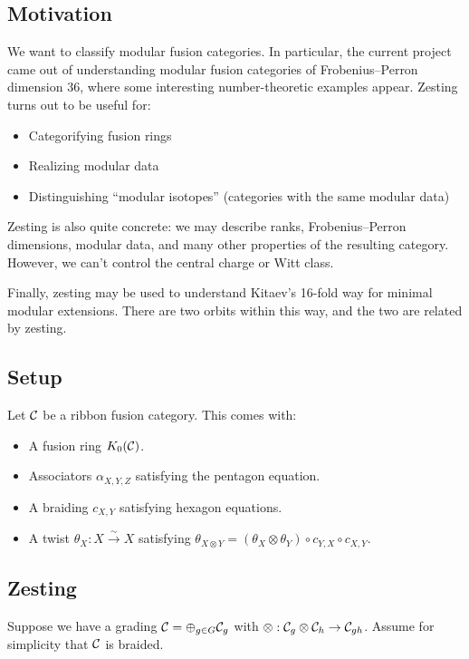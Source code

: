 \documentclass{amsart}
\begin{document}
\subsection{Motivation}

We want to classify modular fusion categories.
In particular, the current project came out of understanding modular fusion categories of Frobenius--Perron dimension $36$, where some interesting number-theoretic examples appear.
Zesting turns out to be useful for:
\begin{itemize}
  \item Categorifying fusion rings
  \item Realizing modular data
  \item Distinguishing ``modular isotopes'' (categories with the same modular data)
\end{itemize}

Zesting is also quite concrete: we may describe ranks, Frobenius--Perron dimensions, modular data, and many other properties of the resulting category.
However, we can't control the central charge or Witt class.

Finally, zesting may be used to understand Kitaev's 16-fold way for minimal modular extensions.
There are two orbits within this way, and the two are related by zesting.

\subsection{Setup}

Let $\mathcal{C}$ be a ribbon fusion category.
This comes with:
\begin{itemize}
  \item A fusion ring $K_0(\mathcal{C})$.
  \item Associators $\alpha_{X,Y,Z}$ satisfying the pentagon equation.
  \item A braiding $c_{X,Y}$ satisfying hexagon equations.
  \item A twist $\theta_X: X \xrightarrow{\sim} X$ satisfying $\theta_{X \otimes Y} = (\theta_X \otimes \theta_Y) \circ c_{Y,X} \circ c_{X,Y}$.
\end{itemize}

\subsection{Zesting}

Suppose we have a grading $\mathcal{C} = \oplus_{g \in G} \mathcal{C}_g$ with $\otimes: \mathcal{C}_g \otimes \mathcal{C}_h \to \mathcal{C}_{gh}$.
Assume for simplicity that $\mathcal{C}$ is braided.
\end{document}
